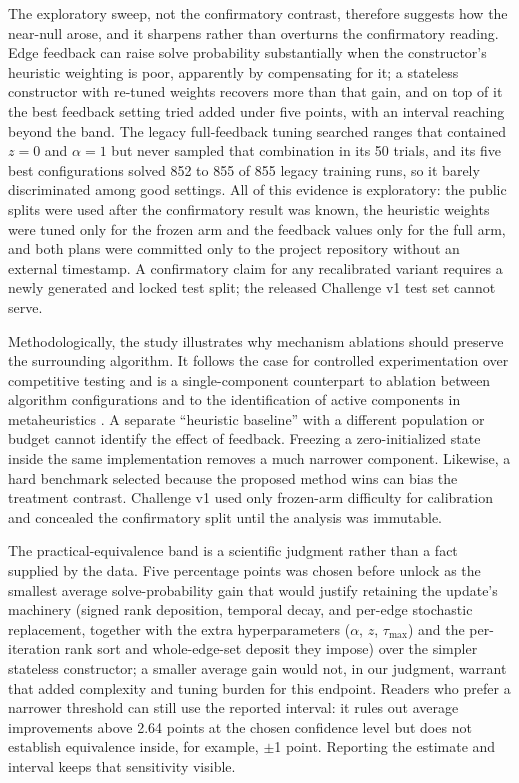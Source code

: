 \documentclass[pdflatex,sn-basic,iicol]{sn-jnl}
\begin{document}
The exploratory sweep, not the confirmatory contrast, therefore suggests how the near-null arose, and it sharpens rather than overturns the confirmatory reading. Edge feedback can raise solve probability substantially when the constructor's heuristic weighting is poor, apparently by compensating for it; a stateless constructor with re-tuned weights recovers more than that gain, and on top of it the best feedback setting tried added under five points, with an interval reaching beyond the band. The legacy full-feedback tuning searched ranges that contained $z = 0$ and $\alpha = 1$ but never sampled that combination in its 50 trials, and its five best configurations solved 852 to 855 of 855 legacy training runs, so it barely discriminated among good settings. All of this evidence is exploratory: the public splits were used after the confirmatory result was known, the heuristic weights were tuned only for the frozen arm and the feedback values only for the full arm, and both plans were committed only to the project repository without an external timestamp. A confirmatory claim for any recalibrated variant requires a newly generated and locked test split; the released Challenge v1 test set cannot serve.

Methodologically, the study illustrates why mechanism ablations should preserve the surrounding algorithm. It follows the case for controlled experimentation over competitive testing \citep{hooker1995testing} and is a single-component counterpart to ablation between algorithm configurations \citep{fawcett2016ablation} and to the identification of active components in metaheuristics \citep{villagra2015active}. A separate ``heuristic baseline'' with a different population or budget cannot identify the effect of feedback. Freezing a zero-initialized state inside the same implementation removes a much narrower component. Likewise, a hard benchmark selected because the proposed method wins can bias the treatment contrast. Challenge v1 used only frozen-arm difficulty for calibration and concealed the confirmatory split until the analysis was immutable.

The practical-equivalence band is a scientific judgment rather than a fact supplied by the data. Five percentage points was chosen before unlock as the smallest average solve-probability gain that would justify retaining the update's machinery (signed rank deposition, temporal decay, and per-edge stochastic replacement, together with the extra hyperparameters ($\alpha$, $z$, $\tau_{\max}$) and the per-iteration rank sort and whole-edge-set deposit they impose) over the simpler stateless constructor; a smaller average gain would not, in our judgment, warrant that added complexity and tuning burden for this endpoint. Readers who prefer a narrower threshold can still use the reported interval: it rules out average improvements above 2.64 points at the chosen confidence level but does not establish equivalence inside, for example, \(\pm\)1 point. Reporting the estimate and interval keeps that sensitivity visible.
\end{document}
